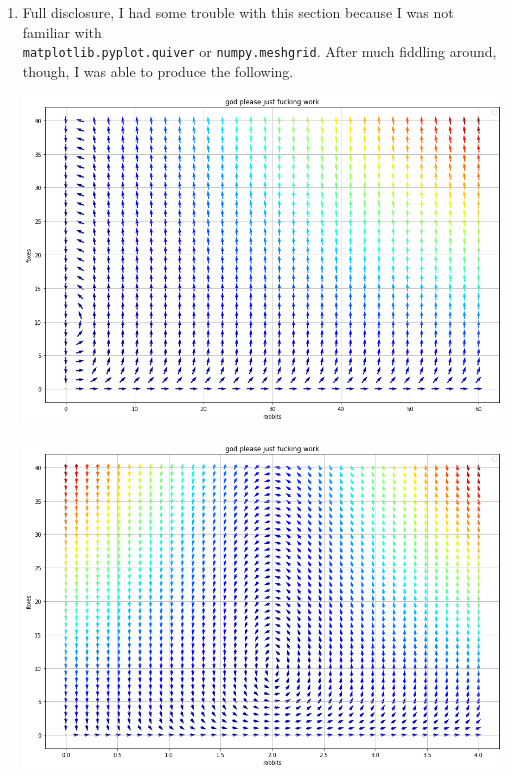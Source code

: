 \documentclass[11pt]{article}
\begin{document}
\begin{enumerate}
        \item Full disclosure, I had some trouble with this section because I
            was not familiar with \\ \texttt{matplotlib.pyplot.quiver} or
            \texttt{numpy.meshgrid}. After much fiddling around, though, I was
            able to produce the following.

            \begin{minipage}[t]{0.5\linewidth}
                \begin{center}
                    \includegraphics[width=.9\linewidth]{vec1.png}
                \end{center}
            \end{minipage}%
            \begin{minipage}[t]{0.5\linewidth}
                \begin{center}
                    \includegraphics[width=.9\linewidth]{vec2.png}
                \end{center}
            \end{minipage}


\end{enumerate}
\end{document}
